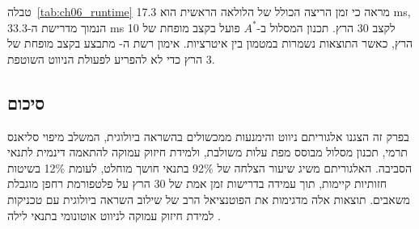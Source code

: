 \begin{table}[htbp]
\centering
\caption{ניתוח זמני ריצה של רכיבי האלגוריתם. (Runtime analysis of algorithm components.)}
\label{tab:ch06_runtime}
\end{table}

טבלה~\ref{tab:ch06_runtime} מראה כי זמן הריצה הכולל של הלולאה הראשית הוא 17.3 ms, הנמוך מדרישת ה-33.3 ms לקצב 30 הרץ. תכנון המסלול ב-$A^*$ פועל בקצב מופחת של 10 הרץ, כאשר התוצאות נשמרות במטמון בין איטרציות. אימון רשת ה- מתבצע בקצב מופחת של 3 הרץ כדי לא להפריע לפעולת הניווט השוטפת.

\subsection{סיכום}
\label{sec:ch06_summary}

בפרק זה הצגנו אלגוריתם ניווט והימנעות ממכשולים בהשראה ביולוגית, המשלב מיפוי סליאנס תרמי, תכנון מסלול מבוסס מפת עלות משולבת, ולמידת חיזוק עמוקה להתאמה דינמית לתנאי הסביבה. האלגוריתם משיג שיעור הצלחה של 92\% בתנאי חושך מוחלט, לעומת 12\% בשיטות חזותיות קיימות, תוך עמידה בדרישות זמן אמת של 30 הרץ על פלטפורמת רחפן מוגבלת משאבים. תוצאות אלה מדגימות את הפוטנציאל הרב של שילוב השראה ביולוגית עם טכניקות למידת חיזוק עמוקה לניווט אוטונומי בתנאי לילה \cite{Thrun2005ProbRobotics, Kalman1960}.